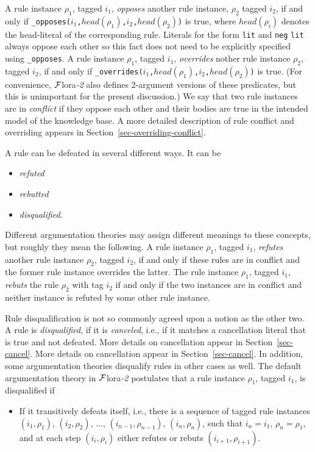 \documentclass[11pt]{article}
\newcommand{\FLORA}{{\mbox{\sc ${\cal F}${lora}\rm\emph{-2}}}\xspace}
\begin{document}
A rule instance $\rho_1$, tagged $i_1$, \emph{opposes} another rule
instance, $\rho_2$ tagged $i_2$, if and only if
\texttt{\_opposes($i_1$,$head(\rho_1)$,$i_2$,$head(\rho_2)$)} is true,
where $head(\rho_i)$ denotes the head-literal of the corresponding rule.
Literals for the form \texttt{lit} and \texttt{neg}  \texttt{lit} always oppose 
each other so this fact does not need to be explicitly specified using
\texttt{\_opposes}.   
A rule instance $\rho_1$, tagged
$i_1$, \emph{overrides} nother rule instance $\rho_2$, tagged $i_2$, if and
only if \texttt{\_overrides($i_1$,$head(\rho_1)$,$i_2$,$head(\rho_2)$)} is
true. (For convenience, \FLORA also defines 2-argument versions of these
predicates, but this is unimportant for the present discussion.)
We say that two rule instances are in \emph{conflict} if they oppose each other
and their bodies are true in the intended model of the knowledge base.
A more detailed description of rule conflict and overriding appears in
Section~\ref{sec-overriding-conflict}.

A rule can be defeated in several different ways. It can be
\begin{itemize}
\item  \emph{refuted}
\item  \emph{rebutted} 
\item  \emph{disqualified}. 
\end{itemize}
Different argumentation theories may assign different meanings to these
concepts, but roughly they mean the following. A rule instance $\rho_1$,
tagged $i_1$, \emph{refutes} another rule instance $\rho_2$, tagged $i_2$, 
if and only if these rules are in conflict and the former rule instance
overrides the latter. The rule instance $\rho_1$,
tagged $i_1$, \emph{rebuts} the rule $\rho_2$ with tag $i_2$ if and only if the two
instances are in conflict and neither instance is refuted by some other
rule instance.

Rule disqualification is not so commonly agreed upon a notion as the other
two.  A rule is \emph{disqualified}, if it is \emph{canceled}, i.e., 
if it matches a
cancellation literal that is true and not defeated. More details on
cancellation appear in Section~\ref{sec-cancel}. More details on
cancellation appear in Section~\ref{sec-cancel}. In addition, some
argumentation theories disqualify rules in other cases as well.
The default argumentation theory in \FLORA postulates that a
rule instance $\rho_1$, tagged $i_1$, is disqualified if
\begin{itemize}
\item If it transitively defeats itself, i.e., there is a sequence of
  tagged rule instances $(i_1,\rho_1)$, $(i_2,\rho_2)$, ...,
  $(i_{n-1},\rho_{n-1})$, $(i_n,\rho_n)$, such that $i_n=i_1$,
  $\rho_n=\rho_1$, and at each step $(i_i,\rho_i)$ either refutes or rebuts
  $(i_{i+1},\rho_{i+1})$.
\end{itemize}
\end{document}
